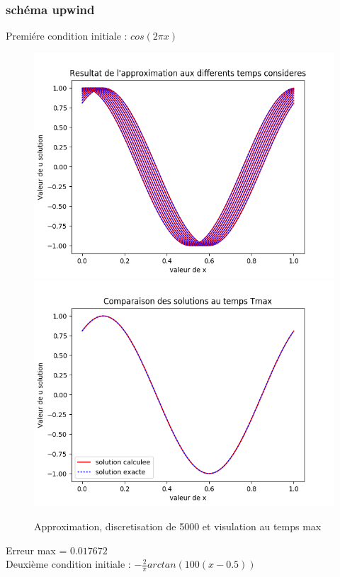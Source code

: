 \documentclass[12pt]{article}
\begin{document}
\subsubsection{schéma upwind}
Premiére condition initiale : $cos(2 \pi x)$
 \begin{figure}[H]
	\centering
	\includegraphics[scale=0.45]{1D_c1_5000_s1.png}
	\includegraphics[scale=0.45]{Temp_max_c1_5000_s1.png}
	\caption{Approximation, discretisation de 5000 et visulation au temps max}
	\label{1D} 
	\end{figure}
Erreur max = $0.017672$
\\Deuxième condition initiale : $-\frac{2}{\pi}arctan(100(x-0.5))$
\end{document}
